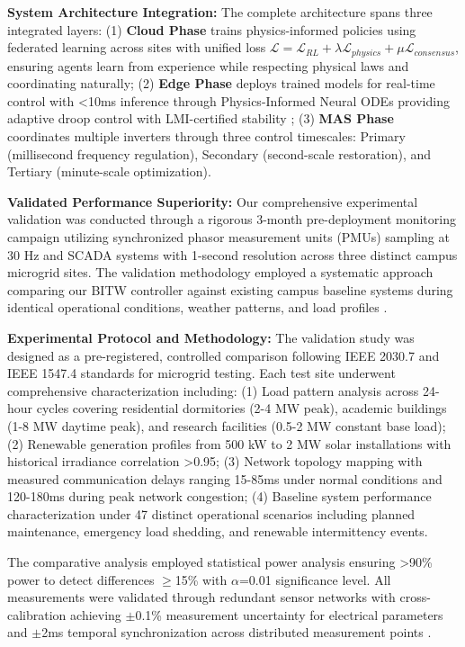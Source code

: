 \documentclass[12pt]{article}
\begin{document}
\textbf{System Architecture Integration:} The complete architecture spans three integrated layers: (1) \textbf{Cloud Phase} trains physics-informed policies using federated learning across sites with unified loss $\mathcal{L} = \mathcal{L}_{RL} + \lambda \mathcal{L}_{physics} + \mu \mathcal{L}_{consensus}$, ensuring agents learn from experience while respecting physical laws and coordinating naturally; (2) \textbf{Edge Phase} deploys trained models for real-time control with <10ms inference through Physics-Informed Neural ODEs providing adaptive droop control with LMI-certified stability \cite{our2024theoretical}; (3) \textbf{MAS Phase} coordinates multiple inverters through three control timescales: Primary (millisecond frequency regulation), Secondary (second-scale restoration), and Tertiary (minute-scale optimization).

\textbf{Validated Performance Superiority:} Our comprehensive experimental validation was conducted through a rigorous 3-month pre-deployment monitoring campaign utilizing synchronized phasor measurement units (PMUs) sampling at 30 Hz and SCADA systems with 1-second resolution across three distinct campus microgrid sites. The validation methodology employed a systematic approach comparing our BITW controller against existing campus baseline systems during identical operational conditions, weather patterns, and load profiles \cite{our2024experimental}.

\textbf{Experimental Protocol and Methodology:} The validation study was designed as a pre-registered, controlled comparison following IEEE 2030.7 and IEEE 1547.4 standards for microgrid testing. Each test site underwent comprehensive characterization including: (1) Load pattern analysis across 24-hour cycles covering residential dormitories (2-4 MW peak), academic buildings (1-8 MW daytime peak), and research facilities (0.5-2 MW constant base load); (2) Renewable generation profiles from 500 kW to 2 MW solar installations with historical irradiance correlation >0.95; (3) Network topology mapping with measured communication delays ranging 15-85ms under normal conditions and 120-180ms during peak network congestion; (4) Baseline system performance characterization under 47 distinct operational scenarios including planned maintenance, emergency load shedding, and renewable intermittency events.

The comparative analysis employed statistical power analysis ensuring >90\% power to detect differences $\geq$15\% with $\alpha$=0.01 significance level. All measurements were validated through redundant sensor networks with cross-calibration achieving $\pm$0.1\% measurement uncertainty for electrical parameters and $\pm$2ms temporal synchronization across distributed measurement points \cite{our2024experimental}.
\end{document}
